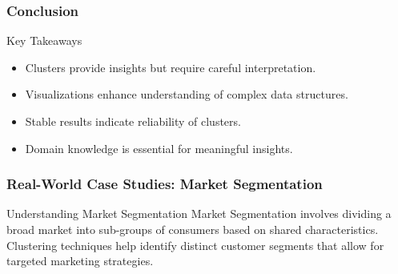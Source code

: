 \documentclass[aspectratio=169]{beamer}
\begin{document}
\begin{frame}[fragile]
    \frametitle{Conclusion}
    \begin{block}{Key Takeaways}
        \begin{itemize}
            \item Clusters provide insights but require careful interpretation.
            \item Visualizations enhance understanding of complex data structures.
            \item Stable results indicate reliability of clusters.
            \item Domain knowledge is essential for meaningful insights.
        \end{itemize}
    \end{block}
\end{frame}

\begin{frame}[fragile]
    \frametitle{Real-World Case Studies: Market Segmentation}
    \begin{block}{Understanding Market Segmentation}
        Market Segmentation involves dividing a broad market into sub-groups of consumers based on shared characteristics. 
        Clustering techniques help identify distinct customer segments that allow for targeted marketing strategies.
    \end{block}
\end{frame}
\end{document}
